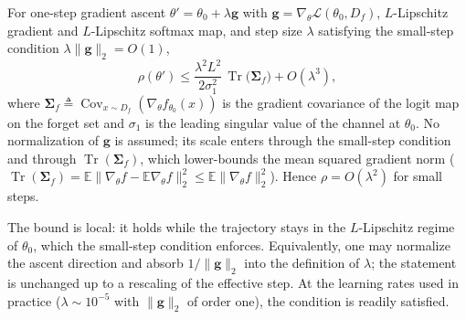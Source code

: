 \documentclass[smallextended]{svjour3}       %
\newcommand{\coloneqq}{\triangleq}
\begin{document}
\begin{theorem}
\label{thm:finetune}
For one-step gradient ascent $\theta' = \theta_0 + \lambda\mathbf{g}$ with $\mathbf{g}=\nabla_\theta\mathcal{L}(\theta_0, D_f)$, $L$-Lipschitz gradient and $L$-Lipschitz softmax map, and step size $\lambda$ satisfying the small-step condition $\lambda\|\mathbf{g}\|_2=O(1)$,
\begin{equation}
\rho(\theta') \le \frac{\lambda^2 L^2}{2\sigma_1^2}\,\operatorname{Tr}\bigl(\boldsymbol{\Sigma}_f\bigr) + O(\lambda^3),
\label{eq:finetune_bound}
\end{equation}
where $\boldsymbol{\Sigma}_f \coloneqq \operatorname{Cov}_{x\sim D_f}(\nabla_\theta f_{\theta_0}(x))$ is the gradient covariance of the logit map on the forget set and $\sigma_1$ is the leading singular value of the channel at $\theta_0$. No normalization of $\mathbf{g}$ is assumed; its scale enters through the small-step condition and through $\operatorname{Tr}(\boldsymbol{\Sigma}_f)$, which lower-bounds the mean squared gradient norm ($\operatorname{Tr}(\boldsymbol{\Sigma}_f)=\mathbb{E}\|\nabla_\theta f-\mathbb{E}\nabla_\theta f\|_2^2\le\mathbb{E}\|\nabla_\theta f\|_2^2$). Hence $\rho = O(\lambda^2)$ for small steps.
\end{theorem}

\begin{remark}
The bound is local: it holds while the trajectory stays in the $L$-Lipschitz regime of $\theta_0$, which the small-step condition enforces. Equivalently, one may normalize the ascent direction and absorb $1/\|\mathbf{g}\|_2$ into the definition of $\lambda$; the statement is unchanged up to a rescaling of the effective step. At the learning rates used in practice ($\lambda{\sim}10^{-5}$ with $\|\mathbf{g}\|_2$ of order one), the condition is readily satisfied.
\end{remark}
\end{document}
